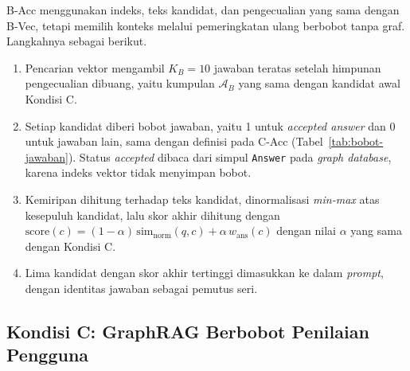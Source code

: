 B-Acc menggunakan indeks, teks kandidat, dan pengecualian yang sama dengan B-Vec, tetapi memilih konteks melalui pemeringkatan ulang berbobot tanpa graf. Langkahnya sebagai berikut.
\begin{enumerate}
    \item Pencarian vektor mengambil $K_B=10$ jawaban teratas setelah himpunan pengecualian dibuang, yaitu kumpulan $\mathcal{A}_B$ yang sama dengan kandidat awal Kondisi C.
    \item Setiap kandidat diberi bobot jawaban, yaitu 1 untuk \emph{accepted answer} dan 0 untuk jawaban lain, sama dengan definisi pada C-Acc (Tabel~\ref{tab:bobot-jawaban}). Status \emph{accepted} dibaca dari simpul \texttt{Answer} pada \emph{graph database}, karena indeks vektor tidak menyimpan bobot.
    \item Kemiripan dihitung terhadap teks kandidat, dinormalisasi \emph{min-max} atas kesepuluh kandidat, lalu skor akhir dihitung dengan $\mathrm{score}(c)=(1-\alpha)\,\mathrm{sim}_{\mathrm{norm}}(q,c)+\alpha\,w_{\mathrm{ans}}(c)$ dengan nilai $\alpha$ yang sama dengan Kondisi C.
    \item Lima kandidat dengan skor akhir tertinggi dimasukkan ke dalam \emph{prompt}, dengan identitas jawaban sebagai pemutus seri.
\end{enumerate}

\subsection{Kondisi C: GraphRAG Berbobot Penilaian Pengguna}
\label{subsec:implementasi-kondisi-c}

